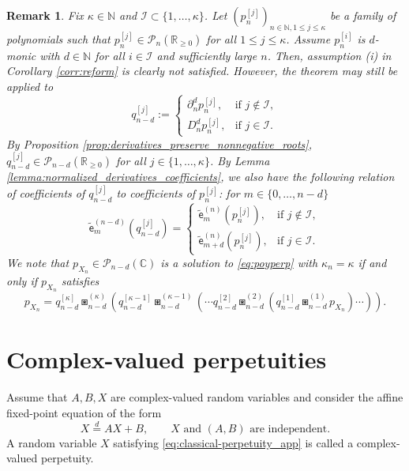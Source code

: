 \documentclass[a4paper,11pt]{amsart}
\numberwithin{equation}{section}
\newtheorem{remark}[theorem]{Remark}
\newcommand{\C}{\mathbb{C}}
\newcommand{\N}{\mathbb{N}}
\newcommand{\R}{\mathbb{R}}
\newcommand{\pols}{\mathcal P}
\newcommand{\coef}[2]{\widetilde{\mathsf{e}}_{#1}^{(#2)}} %
\begin{document}
\begin{remark}
    Fix $\kappa\in\N$ and $\mathcal{I}\subset\{1,\dots,\kappa\}$. Let $(p_n^{[j]})_{n \in \N, 1 \le j \le \kappa}$ be a family of polynomials such that $p_n^{[j]} \in \mathcal{P}_n(\R_{\ge 0})$ for all $1\le j\le\kappa$. Assume $p_n^{[i]}$ is $d$-monic with $d\in\N$ for all $i\in\mathcal{I}$ and sufficiently large $n$. Then, assumption (i) in Corollary \ref{corr:reform} is clearly not satisfied. However, the theorem may still be applied to 
    \[
q_{n-d}^{[j]} := 
\begin{cases} 
    \partial_n^dp_n^{[j]}, & \text{if } j\notin\mathcal{I}, \\
    D_n^dp_n^{[j]},   & \text{if } j\in\mathcal{I}.
\end{cases}
\]
By Proposition \ref{prop:derivatives_preserve_nonnegative_roots},  $q_{n-d}^{[j]}\in\pols_{n-d}(\R_{\ge 0})$ for all $j\in\{1,\dots,\kappa\}$. By Lemma \ref{lemma:normalized_derivatives_coefficients}, we also have the following relation of coefficients of $q_{n-d}^{[j]}$ to coefficients of $p_{n}^{[j]}$: for $m\in\{0,\dots,n-d\}$
\[
\coef{m}{n-d}(q_{n-d}^{[j]}) = 
\begin{cases} 
    \coef{m}{n}(p_{n}^{[j]}), & \text{if } j\notin\mathcal{I}, \\
    \coef{m+d}{n}(p_{n}^{[j]}),   & \text{if } j\in\mathcal{I}.
\end{cases}
\]
We note that $p_{X_n}\in\pols_{n-d}(\C)$ is a solution to \eqref{eq:poyperp} with $\kappa_n=\kappa$ if and only if $p_{X_n}$ satisfies
\[
p_{X_n} =  q_{n-d}^{[\kappa]}\boxast_{n-d}^{(\kappa)} \left( q_{n-d}^{[\kappa-1]}\boxast_{n-d}^{(\kappa-1)}\left(\cdots q_{n-d}^{[2]}\boxast_{n-d}^{(2)}\left( q_{n-d}^{[1]}\boxast_{n-d}^{(1)} p_{X_n}\right)\cdots \right)\right).
\]
\end{remark}


\appendix

\section{Complex-valued perpetuities}\label{app}

Assume that $A,B,X$ are complex-valued random variables and consider the affine fixed-point equation of the form
\begin{equation}\label{eq:classical-perpetuity_app}
X \stackrel{d}{=} AX+B,\qquad X\mbox{ and }(A,B)\mbox{ are independent}.
\end{equation}
A random variable $X$ satisfying
\eqref{eq:classical-perpetuity_app} is called a complex-valued perpetuity.
\end{document}
